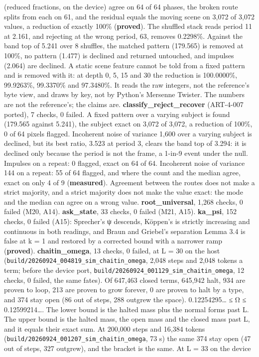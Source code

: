 \begin{description}
(reduced fractions, on the device) agree on 64 of 64 phases, the broken route splits from each on 61, and the residual equals the moving scene on 3,072 of 3,072 values, a reduction of exactly 100\% (\textbf{proved}). The shuffled stack reads period 11 at 2.161, and rejecting at the wrong period, 63, removes 0.2298\%. Against the band top of 5.241 over 8 shuffles, the matched pattern (179.565) is removed at 100\%, no pattern (1.477) is declined and returned untouched, and impulses (2.064) are declined. A static scene feature cannot be told from a fixed pattern and is removed with it: at depth 0, 5, 15 and 30 the reduction is 100.0000\%, 99.9263\%, 99.3370\% and 97.3480\%. It reads the raw integers, not the reference's byte view, and draws by key, not by Python's Mersenne Twister. The numbers are not the reference's; the claims are. \textbf{classify\_\allowbreak{}reject\_\allowbreak{}recover} (ART-4-007 ported), 7 checks, 0 failed. A fixed pattern over a varying subject is found (179.565 against 5.241), the subject exact on 3,072 of 3,072, a reduction of 100\%, 0 of 64 pixels flagged. Incoherent noise of variance 1,600 over a varying subject is declined, but its best ratio, 3.523 at period 3, clears the band top of 3.294: it is declined only because the period is not the frame, a 1-in-9 event under the null. Impulses on a repeat: 0 flagged, exact on 64 of 64. Incoherent noise of variance 144 on a repeat: 55 of 64 flagged, and where the count and the median agree, exact on only 4 of 9 (\textbf{measured}). Agreement between the routes does not make a strict majority, and a strict majority does not make the value exact: the mode and the median can agree on a wrong value. \textbf{root\_\allowbreak{}universal}, 1,268 checks, 0 failed (M20, A14). \textbf{ask\_\allowbreak{}state}, 33 checks, 0 failed (M21, A15). \textbf{ka\_\allowbreak{}psi}, 152 checks, 0 failed (A15): Sprecher's ψ descends, Köppen's is strictly increasing and continuous in both readings, and Braun and Griebel's separation Lemma 3.4 is false at k = 1 and restored by a corrected bound with a narrower ramp (\textbf{proved}). \textbf{chaitin\_\allowbreak{}omega}, 13 checks, 0 failed, at L = 30 on the host (\texttt{build/\allowbreak{}20260924\_\allowbreak{}004819\_\allowbreak{}sim\_\allowbreak{}chaitin\_\allowbreak{}omega}, 2,048 steps and 2,048 tokens a term; before the device port, \texttt{build/\allowbreak{}20260924\_\allowbreak{}001129\_\allowbreak{}sim\_\allowbreak{}chaitin\_\allowbreak{}omega}, 12 checks, 0 failed, the same fates). Of 647,463 closed terms, 645,942 halt, 934 are proven to loop, 213 are proven to grow forever, 0 are proven to halt by a type, and 374 stay open (86 out of steps, 288 outgrew the space). 0.12254295… ≤ Ω ≤ 0.12599214…. The lower bound is the halted mass plus the normal forms past L. The upper bound is the halted mass, the open mass and the closed mass past L, and it equals their exact sum. At 200,000 steps and 16,384 tokens (\texttt{build/\allowbreak{}20260924\_\allowbreak{}001207\_\allowbreak{}sim\_\allowbreak{}chaitin\_\allowbreak{}omega}, 73 s) the same 374 stay open (47 out of steps, 327 outgrew), and the bracket is the same. At L = 33 on the device 
\end{description}
